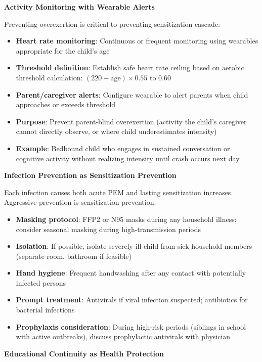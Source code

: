 \begin{protocol}
\textbf{Activity Monitoring with Wearable Alerts}

Preventing overexertion is critical to preventing sensitization cascade:

\begin{itemize}
    \item \textbf{Heart rate monitoring}: Continuous or frequent monitoring using wearables appropriate for the child's age
    \item \textbf{Threshold definition}: Establish safe heart rate ceiling based on aerobic threshold calculation: $(220 - \text{age}) \times 0.55$ to $0.60$
    \item \textbf{Parent/caregiver alerts}: Configure wearable to alert parents when child approaches or exceeds threshold
    \item \textbf{Purpose}: Prevent parent-blind overexertion (activity the child's caregiver cannot directly observe, or where child underestimates intensity)
    \item \textbf{Example}: Bedbound child who engages in sustained conversation or cognitive activity without realizing intensity until crash occurs next day
\end{itemize}

\textbf{Infection Prevention as Sensitization Prevention}

Each infection causes both acute PEM and lasting sensitization increases. Aggressive prevention is sensitization prevention:

\begin{itemize}
    \item \textbf{Masking protocol}: FFP2 or N95 masks during any household illness; consider seasonal masking during high-transmission periods
    \item \textbf{Isolation}: If possible, isolate severely ill child from sick household members (separate room, bathroom if feasible)
    \item \textbf{Hand hygiene}: Frequent handwashing after any contact with potentially infected persons
    \item \textbf{Prompt treatment}: Antivirals if viral infection suspected; antibiotics for bacterial infections
    \item \textbf{Prophylaxis consideration}: During high-risk periods (siblings in school with active outbreaks), discuss prophylactic antivirals with physician
\end{itemize}

\textbf{Educational Continuity as Health Protection}


\end{protocol}
